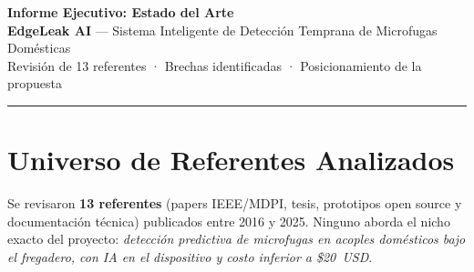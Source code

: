 \documentclass[11pt,a4paper]{article}
\begin{document}
\begin{center}
  {\Large\textbf{Informe Ejecutivo: Estado del Arte}}\\[2pt]
  {\large\textcolor{primaryblue}{\textbf{EdgeLeak AI}} — Sistema Inteligente de Detección
  Temprana de Microfugas Domésticas}\\[2pt]
  {\small Revisión de 13 referentes · Brechas identificadas · Posicionamiento de la propuesta}
\end{center}
\vspace{-4pt}
\textcolor{primaryblue}{\rule{\linewidth}{1.2pt}}
\vspace{2pt}

\section{Universo de Referentes Analizados}

Se revisaron \textbf{13 referentes} (papers IEEE/MDPI, tesis, prototipos open source y
documentación técnica) publicados entre 2016 y 2025. Ninguno aborda el nicho exacto del
proyecto: \textit{detección predictiva de microfugas en acoples domésticos bajo el
fregadero, con IA en el dispositivo y costo inferior a \$20~USD}.
\end{document}
